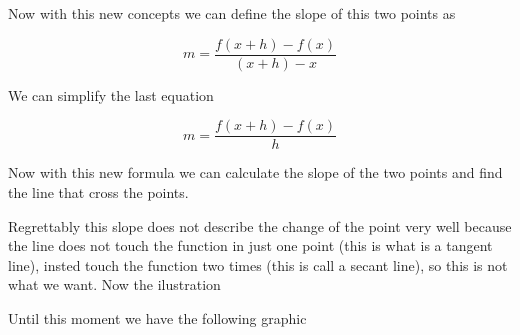 \documentclass[12pt,journal]{IEEEtran}
\begin{document}
    Now with this new concepts we can define the slope of this two points as 

    \begin{equation}
        m = \frac{f(x+h) - f(x)}{(x+h) - x}
    \end{equation}

    We can simplify the last equation

    \begin{equation}
        m = \frac{f(x+h) - f(x)}{h}
    \end{equation}

    Now with this new formula we can calculate the slope of the two points and
    find the line that cross the points.

    Regrettably this slope does not describe the change of the point very well
    because the line does not touch the function in just one point (this is
    what is a tangent line), insted touch the function two times (this is call a 
    secant line), so this is not what we want. Now the ilustration \\


    Until this moment we have the following graphic \\
\end{document}
